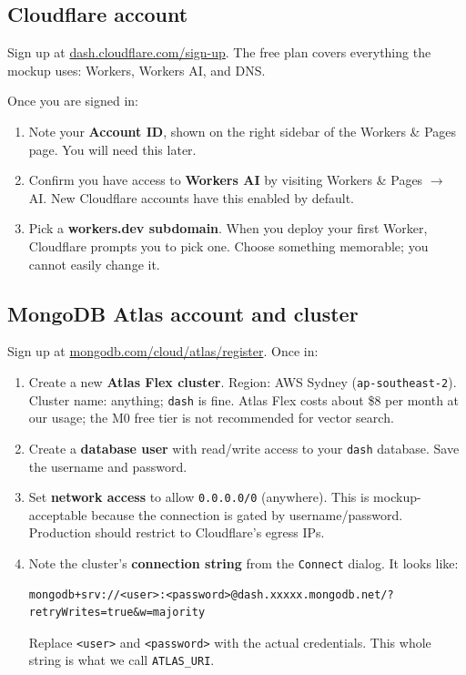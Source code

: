 \documentclass[11pt,a4paper]{article}
\begin{document}
\subsection{Cloudflare account}

Sign up at \href{https://dash.cloudflare.com/sign-up}{dash.cloudflare.com/sign-up}. The free plan covers everything the mockup uses: Workers, Workers AI, and DNS.

Once you are signed in:

\begin{enumerate}[leftmargin=1.5em,itemsep=2pt]
  \item Note your \textbf{Account ID}, shown on the right sidebar of the Workers \& Pages page. You will need this later.
  \item Confirm you have access to \textbf{Workers AI} by visiting Workers \& Pages \(\rightarrow\) AI. New Cloudflare accounts have this enabled by default.
  \item Pick a \textbf{workers.dev subdomain}. When you deploy your first Worker, Cloudflare prompts you to pick one. Choose something memorable; you cannot easily change it.
\end{enumerate}

\subsection{MongoDB Atlas account and cluster}

Sign up at \href{https://www.mongodb.com/cloud/atlas/register}{mongodb.com/cloud/atlas/register}. Once in:

\begin{enumerate}[leftmargin=1.5em,itemsep=2pt]
  \item Create a new \textbf{Atlas Flex cluster}. Region: AWS Sydney (\texttt{ap-southeast-2}). Cluster name: anything; \texttt{dash} is fine. Atlas Flex costs about \$8 per month at our usage; the M0 free tier is not recommended for vector search.
  \item Create a \textbf{database user} with read/write access to your \texttt{dash} database. Save the username and password.
  \item Set \textbf{network access} to allow \texttt{0.0.0.0/0} (anywhere). This is mockup-acceptable because the connection is gated by username/password. Production should restrict to Cloudflare's egress IPs.
  \item Note the cluster's \textbf{connection string} from the \texttt{Connect} dialog. It looks like:
\begin{lstlisting}[style=shell]
mongodb+srv://<user>:<password>@dash.xxxxx.mongodb.net/?retryWrites=true&w=majority
\end{lstlisting}
  Replace \verb|<user>| and \verb|<password>| with the actual credentials. This whole string is what we call \texttt{ATLAS\_URI}.
\end{enumerate}
\end{document}

